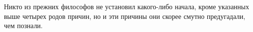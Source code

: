 \documentclass{article}
\begin{document}
Никто из прежних философов не установил какого-либо начала, кроме указанных выше четырех родов причин, но и эти причины они скорее смутно предугадали, чем познали.
\end{document}
